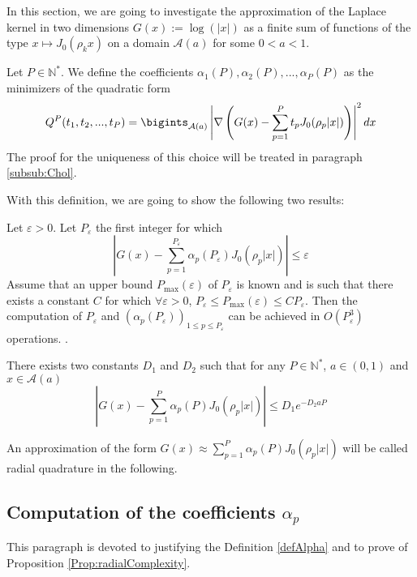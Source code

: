 \documentclass[11pt,a4paper]{article}
\begin{document}
In this section, we are going to investigate the approximation of the Laplace kernel in two dimensions $G(x) := \log(|x|)$ as a finite sum of functions of the type $x \mapsto J_0(\rho_k x)$ on a domain $\mathcal{A}(a)$ for some $0< a <1$. 

\begin{Def} \label{defAlpha}Let $P \in \mathbb{N}^*$. We define the coefficients $\alpha_1(P), \alpha_2(P), ..., \alpha_P(P)$ as the minimizers of the quadratic form
\[ Q^P(t_1,t_2,...,t_P) = \displaystyle \bigints_{\mathcal{A}(a)} \left|\nabla\left( G(x) - \sum_{p=1}^P t_p J_0(\rho_p |x|)\right)\right|^2dx \] 
The proof for the uniqueness of this choice will be treated in paragraph \ref{subsub:Chol}.
\end{Def}
With this definition, we are going to show the following two results: 
\begin{Prop}\label{Prop:radialComplexity} Let $\varepsilon > 0$. Let $P_{\varepsilon}$ the first integer for which \[\left|G(x) - \sum_{p=1}^{P_\varepsilon} \alpha_p(P_\varepsilon) J_0(\rho_p |x|)\right|\leq \varepsilon\] Assume that an upper bound $P_{\max}(\varepsilon)$ of $P_{\varepsilon}$ is known and is such that there exists a constant $C$ for which $\forall \varepsilon > 0$, $P_{\varepsilon} \leq P_{\max}(\varepsilon) \leq C P_{\varepsilon}$. Then the computation of $P_{\varepsilon}$ and $(\alpha_p(P_{\varepsilon}))_{1\leq p \leq P_{\varepsilon}}$ can be achieved in $O(P_{\varepsilon}^3)$ operations. 	. 
\end{Prop}
\begin{Prop}  There exists two constants $D_1$ and $D_2$ such that for any $P \in \mathbb{N}^*$, $a\in (0,1)$ and  $x \in \mathcal{A}(a)$ 
\[ \left|G(x) - \sum_{p=1}^P \alpha_p(P) J_0(\rho_p |x|)\right|\leq D_1e^{-D_2aP}\]
\label{Prop:radial}
\end{Prop}



\begin{Def}An approximation of the form $G(x) \approx \displaystyle\sum_{p=1}^P \alpha_p(P) J_0(\rho_p|x|)$ will be called radial quadrature in the following.
\end{Def}
 

\subsection{Computation of the coefficients $\alpha_p$}
\label{GramShmidtDescription}

This paragraph is devoted to justifying the Definition \ref{defAlpha} and to prove of Proposition \ref{Prop:radialComplexity}.
\end{document}

